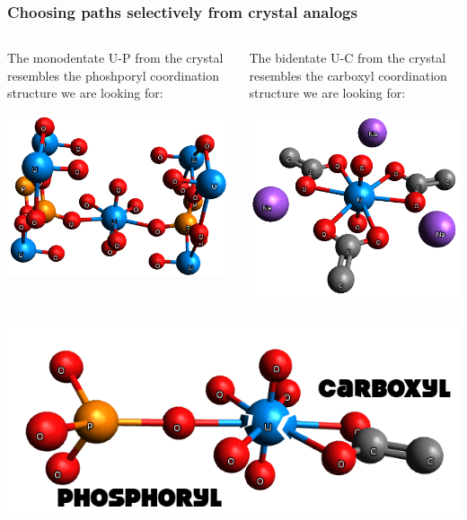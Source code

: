 \documentclass[10pt, xcolor=x11names, compress]{beamer}
\begin{document}
\begin{frame}
  \frametitle{Choosing paths selectively from crystal analogs}
  \small
  \begin{columns}[T]
    \begin{column}{0.5\linewidth}
      \begin{center}
        The monodentate U-P from the crystal resembles the phoshporyl
        coordination structure we are looking for:

        \includegraphics[width=0.7\linewidth]{images/upo4_full.png}
      \end{center}
    \end{column}
    \begin{column}{0.5\linewidth}
      \begin{center}
        The bidentate U-C from the crystal resembles the carboxyl
        coordination structure we are looking for:

        \includegraphics[width=0.65\linewidth]{images/NaU_triacetate.png}
      \end{center}
    \end{column}
  \end{columns}
  \begin{center}
    \includegraphics[width=0.6\linewidth]{images/uranyl.png}
  \end{center}
\end{frame}
\end{document}
